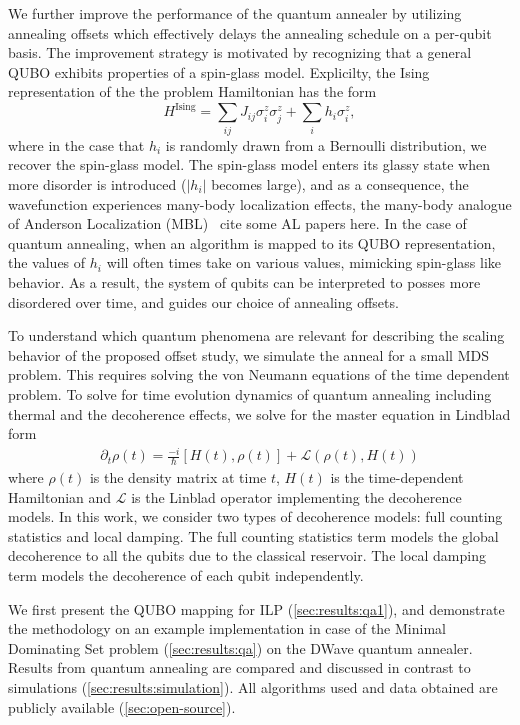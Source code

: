 \documentclass[prd,twocolumn,tightenlines,preprintnumbers,showpacs,superscriptaddress,notitlepage,nofootinbib,eqsecnum,floatfix,longbibliography,aps,10pt]{revtex4-2}
\begin{document}
{\color{green} We further improve the performance of the quantum annealer by utilizing annealing offsets which effectively delays the annealing schedule on a per-qubit basis. The improvement strategy is motivated by recognizing that a general QUBO exhibits properties of a spin-glass model.
Explicilty, the Ising representation of the the problem Hamiltonian has the form
\begin{equation}
 H^{\textrm{Ising}} = \sum_{ij} J_{ij} \sigma^z_i \sigma^z_j + \sum_i h_i \sigma^z_i,
\end{equation}
where in the case that $h_i$ is randomly drawn from a Bernoulli distribution, we recover the spin-glass model.
The spin-glass model enters its glassy state when more disorder is introduced ($|h_i|$ becomes large), and as a consequence, the wavefunction experiences many-body localization effects, the many-body analogue of Anderson Localization (MBL)~{\color{red} cite some AL papers here}.
In the case of quantum annealing, when an algorithm is mapped to its QUBO representation, the values of $h_i$ will often times take on various values, mimicking spin-glass like behavior. As a result, the system of qubits can be interpreted to posses more disordered over time, and guides our choice of annealing offsets.
}

To understand which quantum phenomena are relevant for describing the scaling behavior of the proposed offset study, we simulate the anneal for a small MDS problem.
This requires solving the von Neumann equations of the time dependent problem.
To solve for time evolution dynamics of quantum annealing including thermal and the decoherence effects, we solve for the master equation in Lindblad form
\begin{align}
 \partial_t \rho (t) =  \frac{-i}{\hbar} [H(t) , \rho(t)] + \mathcal{L}(\rho(t), H(t))
\end{align}
where $\rho (t)$ is the density matrix at time $t$, $H(t)$ is the time-dependent Hamiltonian and $\mathcal{L}$ is the Linblad operator implementing the decoherence models.
In this work, we consider two types of decoherence models: full counting statistics and local damping.
The full counting statistics term models the global decoherence to all the qubits due to the classical reservoir.
The local damping term models the decoherence of each qubit independently.


We first present the QUBO mapping for ILP (\ref{sec:results:qa1}), and demonstrate the methodology on an example implementation in case of the Minimal Dominating Set problem (\ref{sec:results:qa}) on the DWave quantum annealer. Results from quantum annealing are compared and discussed in contrast to simulations (\ref{sec:results:simulation}). All algorithms used and data obtained are publicly available (\ref{sec:open-source}).
\end{document}
